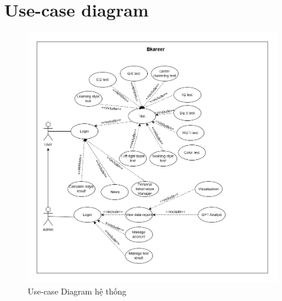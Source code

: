 \section{Use-case diagram}

\begin{figure}[H]
    \centering
    \includegraphics[width=0.8\linewidth]{images/usecase.png}
    \vspace{0.6cm}
    \caption{Use-case Diagram hệ thống}
\end{figure}

